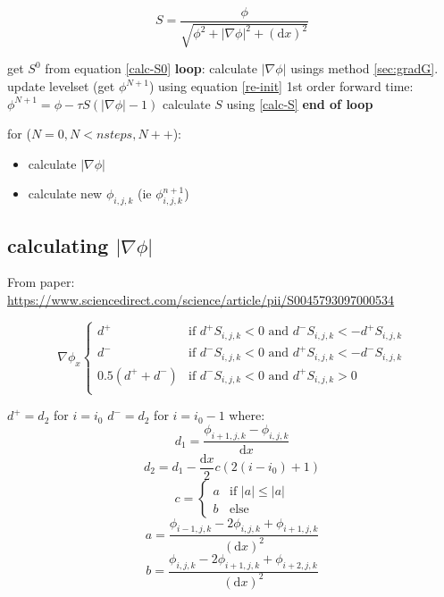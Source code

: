 \documentclass[12pt]{report}
\begin{document}
\begin{equation}
  S = \frac{\phi}{\sqrt{\phi^2 + \lvert \nabla \phi \rvert^2 + \left(\text{d}x \right)^2}}
  \label{calc-S}
\end{equation}

\begin{algorithm}
\begin{algorithmic}[1]
  \State get $S^0$ from equation \ref{calc-S0}
  \State \textbf{loop}:
  \State calculate $\lvert \nabla \phi \rvert$ usings method \ref{sec:gradG}.
  \State update levelset (get $\phi^{N+1}$) using equation \ref{re-init} 1st order forward time:
  $\phi^{N+1} = \phi - \tau S \left(\lvert \nabla \phi \rvert - 1 \right)$
  \State calculate $S$ using \ref{calc-S}
  \State \textbf{end of loop}
\end{algorithmic}
\end{algorithm}






for ($N=0, N<nsteps, N++$):
\begin{itemize}
\item calculate $\lvert \nabla \phi \rvert$
\item calculate new $\phi_{i,j,k}$ (ie $\phi^{n+1}_{i,j,k}$)
\end{itemize}


\subsection*{calculating $\lvert \nabla \phi \rvert$}\label{sec:gradG}

From paper: \url{https://www.sciencedirect.com/science/article/pii/S0045793097000534}

\[ \nabla \phi_x
\begin{cases}
  d^+ & \text{if } d^+ S_{i,j,k} < 0 \text{ and } d^- S_{i,j,k} < -d^+ S_{i,j,k} \\
  d^- & \text{if } d^- S_{i,j,k} < 0 \text{ and } d^+ S_{i,j,k} < -d^- S_{i,j,k} \\
  0.5 \left(d^+ + d^- \right) & \text{if } d^- S_{i,j,k} < 0 \text{ and } d^+ S_{i,j,k} > 0 \\
\end{cases}
\]



$d^+ = d_2$ for $i = i_0$ \newline
$d^- = d_2$ for $i = i_0 - 1$ \newline
where:
\[d_1 = \frac{\phi_{i+1,j,k} - \phi_{i,j,k}}{\text{d}x} \]
\[d_2 = d_1 - \frac{\text{d}x}{2} c \left(2(i - i_0) + 1 \right) \]
\[c =
\begin{cases}
  a & \text{if } \lvert a \rvert \leq \lvert a \rvert \\
  b & \text{else}
\end{cases}
\]
\[a = \frac{\phi_{i-1,j,k} - 2\phi_{i,j,k} + \phi_{i+1,j,k}}{\left(\text{d}x\right)^2} \]
\[b = \frac{\phi_{i,j,k} - 2\phi_{i+1,j,k} + \phi_{i+2,j,k}}{\left(\text{d}x\right)^2} \]
\end{document}
